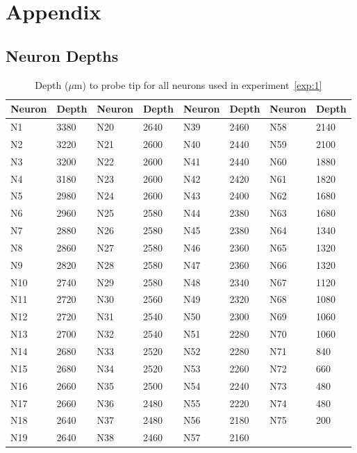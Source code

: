 \documentclass[../CLthesis.tex]{subfiles}
\begin{document}
\chapter{Appendix}%

\label{appendix:Appendix}
\section{Neuron Depths}
\begin{table}[htbp]
\centering
\begin{tabular}{ll||ll||ll||ll}
\toprule
Neuron & Depth & Neuron & Depth & Neuron & Depth & Neuron & Depth \\
\midrule
N1  & 3380 & N20 & 2640 & N39 & 2460 & N58 & 2140 \\
N2  & 3220 & N21 & 2600 & N40 & 2440 & N59 & 2100 \\
N3  & 3200 & N22 & 2600 & N41 & 2440 & N60 & 1880 \\
N4  & 3180 & N23 & 2600 & N42 & 2420 & N61 & 1820 \\
N5  & 2980 & N24 & 2600 & N43 & 2400 & N62 & 1680 \\
N6  & 2960 & N25 & 2580 & N44 & 2380 & N63 & 1680 \\
N7  & 2880 & N26 & 2580 & N45 & 2380 & N64 & 1340 \\
N8  & 2860 & N27 & 2580 & N46 & 2360 & N65 & 1320 \\
N9  & 2820 & N28 & 2580 & N47 & 2360 & N66 & 1320 \\
N10 & 2740 & N29 & 2580 & N48 & 2340 & N67 & 1120 \\
N11 & 2720 & N30 & 2560 & N49 & 2320 & N68 & 1080 \\
N12 & 2720 & N31 & 2540 & N50 & 2300 & N69 & 1060 \\
N13 & 2700 & N32 & 2540 & N51 & 2280 & N70 & 1060 \\
N14 & 2680 & N33 & 2520 & N52 & 2280 & N71 & 840  \\
N15 & 2680 & N34 & 2520 & N53 & 2260 & N72 & 660  \\
N16 & 2660 & N35 & 2500 & N54 & 2240 & N73 & 480  \\
N17 & 2660 & N36 & 2480 & N55 & 2220 & N74 & 480  \\
N18 & 2640 & N37 & 2480 & N56 & 2180 & N75 & 200  \\
N19 & 2640 & N38 & 2460 & N57 & 2160 &     &      \\
\bottomrule
\end{tabular}
\caption{Depth ($\mu$m) to probe tip for all neurons used in experiment~\ref{exp:1}}
\label{tab:neuron_depths}
\end{table}
\end{document}
